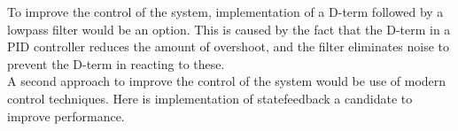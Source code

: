 \documentclass[../../main]{subfiles}
\begin{document}
To improve the control of the system, implementation of a D-term followed by a lowpass filter would be an option. This is caused by the fact that the D-term in a PID controller reduces the amount of overshoot, and the filter eliminates noise to prevent the D-term in reacting to these.\\
A second approach to improve the control of the system would be use of modern control techniques. Here is implementation of statefeedback a candidate to improve performance.
\end{document}
